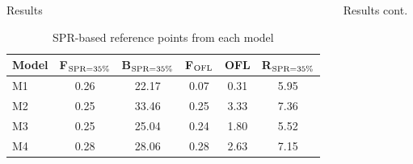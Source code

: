 \documentclass[final]{beamer} %
\newcommand{\fspr}{F$_{\rm{SPR=35\%}}$}
\newcommand{\bspr}{B$_{\rm{SPR=35\%}}$}
\newcommand{\rspr}{R$_{\rm{SPR=35\%}}$}
\newcommand{\fofl}{F$_{\rm{OFL}}$}
\begin{document}
\begin{frame}{}
\begin{columns}[t]
\begin{column}{.3\linewidth}
\begin{block}{\large Results}
          \begin{table}
          \centering
          \caption{SPR-based reference points from each model}
          \begin{tabular}{@{} p{.2\linewidth} c c c c c @{}}
            \toprule
            Model & \fspr &  \bspr & \fofl &  OFL & \rspr \\
            \midrule
            \addlinespace
               \textcolor{cM1}{M1} & 0.26  &  22.17 & 0.07  & 0.31  & 5.95 \\
               \textcolor{cM2}{M2} & 0.25  &  33.46 & 0.25  & 3.33  & 7.36 \\
               \textcolor{cM3}{M3} & 0.25  &  25.04 & 0.24  & 1.80  & 5.52 \\
               \textcolor{cM4}{M4} & 0.28  &  28.06 & 0.28  & 2.63  & 7.15 \\
            \bottomrule
          \end{tabular}
          \label{tab:spr_results}
          \end{table} 
        \end{block}

      \end{column}







      \begin{column}{.3\linewidth}
        \vspace{3in}
        \begin{block}{\large Results cont.}
          \centering
          
          


\end{block}
\end{column}
\end{columns}
\end{frame}
\end{document}
